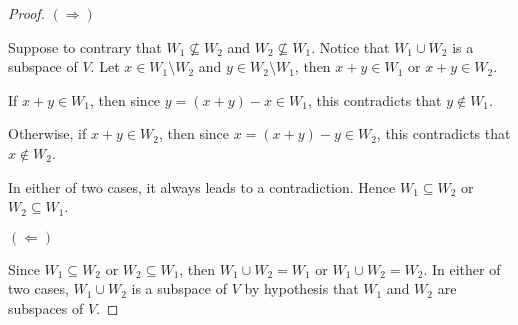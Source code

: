 \begin{Exercise}
	\begin{proof}
		$(\Longrightarrow)$
		
		Suppose to contrary that $W_1\nsubseteq W_2$ and $W_2\nsubseteq W_1$. Notice that $W_1\cup W_2$ is a subspace of $V$. Let $x\in W_1\setminus W_2$ and $y\in W_2\setminus W_1$, then $x+y\in W_1$ or $x+y\in W_2$.
		
		If $x+y\in W_1$, then since $y=(x+y)-x\in W_1$, this contradicts that $y\notin W_1$.
		
		Otherwise, if $x+y\in W_2$, then since $x=(x+y)-y\in W_2$, this contradicts that $x\notin W_2$.
		
		In either of two cases, it always leads to a contradiction. Hence $W_1\subseteq W_2$ or $W_2\subseteq W_1$.
		
		\vspace{2ex}
		
		$(\Longleftarrow)$
		
		Since $W_1\subseteq W_2$ or $W_2\subseteq W_1$, then $W_1\cup W_2 = W_1$ or $W_1\cup W_2 = W_2$. In either of two cases, $W_1\cup W_2$ is a subspace of $V$ by hypothesis that $W_1$ and $W_2$ are subspaces of $V$.
	\end{proof}
\end{Exercise}